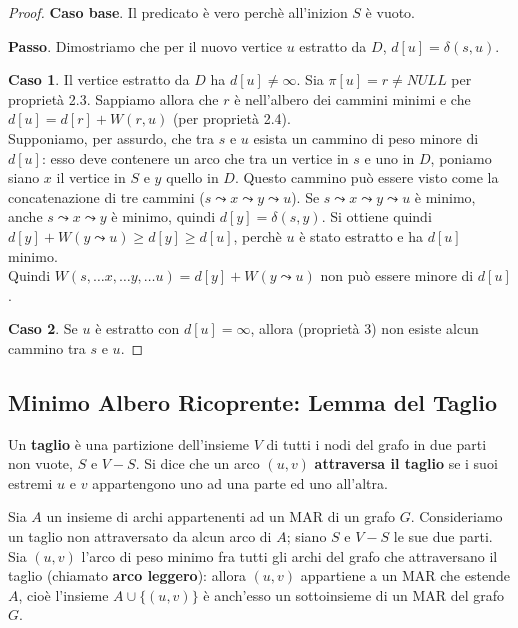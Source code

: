 \documentclass[11pt]{article}
\begin{document}
\begin{proof}
    \textbf{Caso base}. Il predicato è vero perchè all'inizion $S$ è vuoto.

    \textbf{Passo}. Dimostriamo che per il nuovo vertice $u$ estratto da $D$, $d[u]=\delta(s,u)$.

    \textbf{Caso 1}. Il vertice estratto da $D$ ha $d[u]\neq \infty$. Sia $\pi[u]=r\neq NULL$ per proprietà 2.3. Sappiamo 
    allora che $r$ è nell'albero dei cammini minimi e che $d[u]=d[r]+W(r,u)$ (per proprietà 2.4).\\
    Supponiamo, per assurdo, che tra $s$ e $u$ esista un cammino di peso minore di $d[u]$: esso deve contenere un arco che 
    tra un vertice in $s$ e uno in $D$, poniamo siano $x$ il vertice in $S$ e $y$ quello in $D$. Questo cammino può essere 
    visto come la concatenazione di tre cammini ($s\leadsto x\leadsto y \leadsto u$). Se $s\leadsto x\leadsto y \leadsto u$ 
    è minimo, anche $s\leadsto x\leadsto y$ è minimo, quindi $d[y]=\delta(s,y)$. Si ottiene quindi $d[y]+W(y\leadsto u)\geq d[y]\geq d[u]$,
    perchè $u$ è stato estratto e ha $d[u]$ minimo.\\
    Quindi $W(s,\dots x,\dots y,\dots u)=d[y]+W(y\leadsto u)$ non può essere minore di $d[u]$.

    \textbf{Caso 2}. Se $u$ è estratto con $d[u]=\infty$, allora (proprietà 3) non esiste alcun cammino tra $s$ e $u$.
\end{proof} 
\subsection*{Minimo Albero Ricoprente: Lemma del Taglio}
Un \textbf{taglio} è una partizione dell'insieme $V$ di tutti i nodi del grafo in due parti non vuote, $S$ e $V-S$. Si dice 
che un arco $(u,v)$ \textbf{attraversa il taglio} se i suoi estremi $u$ e $v$ appartengono uno ad una parte ed uno all'altra.

Sia $A$ un insieme di archi appartenenti ad un MAR di un grafo $G$. Consideriamo un taglio non attraversato da alcun arco 
di $A$; siano $S$ e $V-S$ le sue due parti. Sia $(u,v)$ l'arco di peso minimo fra tutti gli archi del grafo che attraversano 
il taglio (chiamato \textbf{arco leggero}): allora $(u,v)$ appartiene a un MAR che estende $A$, cioè l'insieme $A\cup \{(u,v)\}$
è anch'esso un sottoinsieme di un MAR del grafo $G$. 
\end{document}
